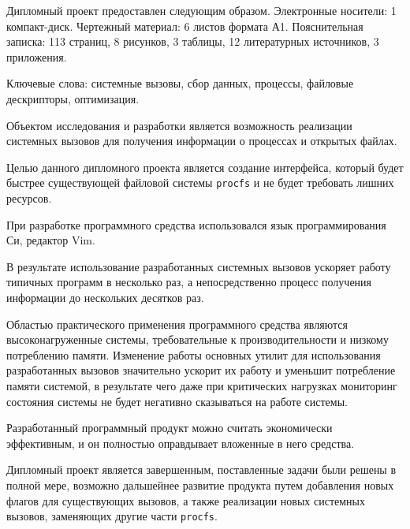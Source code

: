 \begin{titlepage}
\label{sec:ref}

Дипломный проект предоставлен следующим образом. Электронные носители: 1
компакт-диск. Чертежный материал: 6 листов формата А1. Пояснительная записка:
113 страниц, 8 рисунков, 3 таблицы, 12 литературных источников, 3 приложения.

Ключевые слова: системные вызовы, сбор данных, процессы, файловые дескрипторы,
оптимизация.

Объектом исследования и разработки является возможность реализации системных
вызовов для получения информации о процессах и открытых файлах.

Целью данного дипломного проекта является создание интерфейса, который будет
быстрее существующей файловой системы \texttt{procfs} и не будет требовать
лишних ресурсов.

При разработке программного средства использовался язык программирования Си,
редактор Vim. 

В результате использование разработанных системных вызовов ускоряет работу
типичных программ в несколько раз, а непосредственно процесс получения
информации до нескольких десятков раз.

Областью практического применения программного средства являются
высоконагруженные системы, требовательные к производительности и низкому
потреблению памяти. Изменение работы основных утилит для использования
разработанных вызовов значительно ускорит их работу и уменьшит потребление
памяти системой, в результате чего даже при критических нагрузках мониторинг
состояния системы не будет негативно сказываться на работе системы.

Разработанный программный продукт можно считать экономически эффективным, и он
полностью оправдывает вложенные в него средства.

Дипломный проект является завершенным, поставленные задачи были решены в полной
мере, возможно дальшейнее развитие продукта путем добавления новых флагов для
существующих вызовов, а также реализации новых системных вызовов, заменяющих
другие части \texttt{procfs}.
\end{titlepage}
